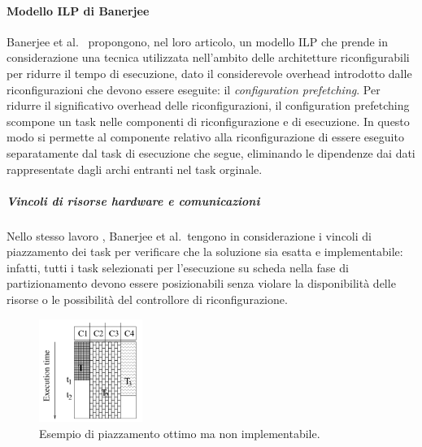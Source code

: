 \paragraph{Modello ILP di Banerjee}
Banerjee et al.~\cite{BanerjeePhysicalConstraints} propongono, nel loro 
articolo, un modello ILP che prende in considerazione una tecnica utilizzata 
nell'ambito delle architetture riconfigurabili per ridurre il tempo di 
esecuzione, dato il considerevole overhead introdotto dalle riconfigurazioni 
che devono essere eseguite: il \emph{configuration prefetching}.
Per ridurre il significativo overhead delle riconfigurazioni, il configuration 
prefetching scompone un task nelle componenti di riconfigurazione e di 
esecuzione. In questo modo si permette al componente relativo alla 
riconfigurazione di essere eseguito separatamente dal task di esecuzione che 
segue, eliminando le dipendenze dai dati rappresentate dagli archi entranti nel 
task orginale.

\subparagraph{Vincoli di risorse hardware e comunicazioni}
Nello stesso lavoro \cite{BanerjeePhysicalConstraints}, Banerjee et al.~tengono 
in considerazione i vincoli di piazzamento dei task per verificare che la 
soluzione sia esatta e implementabile: infatti, tutti i task selezionati per 
l'esecuzione su scheda nella fase di partizionamento devono essere 
posizionabili senza violare la disponibilità delle risorse o le possibilità del 
controllore di riconfigurazione.

\begin{figure}[!htb]
 \begin{center}
  \includegraphics[width=0.3\textwidth]
{./capitoli/figure/cap2/InfeasiblePlacement.pdf}
\caption[Piazzamento ottimo non implementabile]{Esempio di piazzamento ottimo 
ma non implementabile\footnotemark.}
\label{fig:infeasiblePlacement}
 \end{center}
\end{figure}


